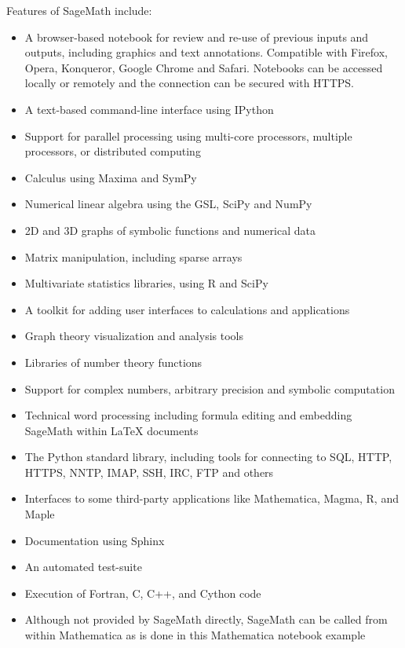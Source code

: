 Features of SageMath include:
\begin{itemize}
\item  A browser-based notebook for review and re-use of previous inputs and outputs, including graphics and text annotations. Compatible with Firefox, Opera, Konqueror, Google Chrome and Safari. Notebooks can be accessed locally or remotely and the connection can be secured with HTTPS.
\item   A text-based command-line interface using IPython
\item   Support for parallel processing using multi-core processors, multiple processors, or distributed computing
\item   Calculus using Maxima and SymPy
\item   Numerical linear algebra using the GSL, SciPy and NumPy
\item   2D and 3D graphs of symbolic functions and numerical data
\item   Matrix manipulation, including sparse arrays
\item  Multivariate statistics libraries, using R and SciPy
\item A toolkit for adding user interfaces to calculations and applications
\item Graph theory visualization and analysis tools
\item Libraries of number theory functions
\item Support for complex numbers, arbitrary precision and symbolic computation
\item Technical word processing including formula editing and embedding SageMath within LaTeX documents
\item The Python standard library, including tools for connecting to SQL, HTTP, HTTPS, NNTP, IMAP, SSH, IRC, FTP and others
\item Interfaces to some third-party applications like Mathematica, Magma, R, and Maple
\item Documentation using Sphinx
\item An automated test-suite
\item Execution of Fortran, C, C++, and Cython code
\item Although not provided by SageMath directly, SageMath can be called from within Mathematica as is done in this Mathematica notebook example
\end{itemize}

